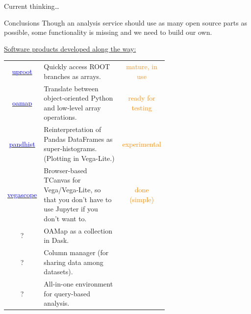 \documentclass[aspectratio=169]{beamer}
\begin{document}
\begin{frame}{Current thinking\ldots}
\vspace{0.5 cm}
\begin{center}
\end{center}
\end{frame}

\begin{frame}{Conclusions}
\vspace{0.35 cm}
Though an analysis service should use as many open source parts as possible, some functionality is missing and we need to build our own.

\vspace{0.25 cm}
\underline{Software products developed along the way:}

\renewcommand{\arraystretch}{1.2}

\vspace{0.25 cm}
\begin{tabular}{c p{0.65\linewidth} c}
\href{https://github.com/scikit-hep/uproot}{\textcolor{blue}{uproot}} & Quickly access ROOT branches as arrays. & \textcolor{darkorange}{mature, in use} \\
\href{https://github.com/diana-hep/oamap}{\textcolor{blue}{oamap}} & Translate between object-oriented Python and low-level array operations. & \textcolor{darkorange}{ready for testing} \\
\href{https://github.com/diana-hep/pandhist}{\textcolor{blue}{pandhist}} & Reinterpretation of Pandas DataFrames as super-histograms. (Plotting in Vega-Lite.) & \textcolor{darkorange}{experimental} \\
\href{https://github.com/diana-hep/vegascope}{\textcolor{blue}{vegascope}} & Browser-based TCanvas for Vega/Vega-Lite, so that you don't have to use Jupyter if you don't want to. & \textcolor{darkorange}{done (simple)} \\
? & OAMap as a collection in Dask. & \\
? & Column manager (for sharing data among datasets). & \\
? & All-in-one environment for query-based analysis. & \\
\end{tabular}
\end{frame}
\end{document}
